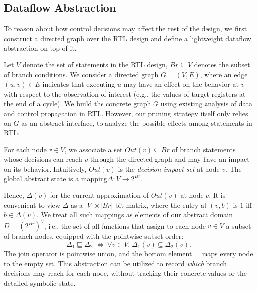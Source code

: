 \documentclass[conference]{IEEEtran}
\begin{document}





\subsection{Dataflow Abstraction}
\label{subsec:dataflow-abstraction}
To reason about how control decisions may affect the rest of the design,
we first construct a directed graph over the RTL design and define a
lightweight dataflow abstraction on top of it.

Let $V$ denote the set of statements in the RTL design, $Br \subseteq V$ denotes the subset of branch conditions. We consider a directed graph $G = (V, E)$,
where an edge $(u, v) \in E$ indicates that executing $u$ may have an
effect on the behavior at $v$ with respect to the observation of
interest (e.g., the values of target registers at the end of a cycle).
We build the concrete graph $G$ using existing analysis of data and control propagation in RTL. However, our pruning strategy itself only relies on $G$ as an abstract interface, to analyze the possible effects among statements in RTL.

For each node $v \in V$,  we associate a set $Out(v) \subseteq Br$ of branch statements whose decisions can reach $v$
through the directed graph and may have an impact on its behavior. Intuitively, $Out(v)$ is the \emph{decision-impact set} at node $v$.
The global abstract state is a mapping$\Delta : V \to 2^{Br}$.

Hence, $\Delta(v)$ for the current approximation of $Out(v)$ at node $v$. It is convenient to view $\Delta$ as a $|V| \times |Br|$ bit matrix, where the entry at $(v, b)$ is $1$ iff $b \in \Delta(v)$.
We treat all such mappings as elements of our abstract domain
$D = (2^{Br})^{V}$, i.e., the set of all functions that assign to each
node $v \in V$ a subset of branch nodes.
equipped with the pointwise subset order:
\[
  \Delta_1 \sqsubseteq \Delta_2
  \;\Longleftrightarrow\;
  \forall v \in V.\;\Delta_1(v) \subseteq \Delta_2(v).
\]
The join operator is pointwise union, and the bottom element $\bot$
maps every node to the empty set. This abstraction can be utilized to record \emph{which} branch decisions may reach
for each node, without tracking their concrete values or the detailed symbolic state.
\end{document}
